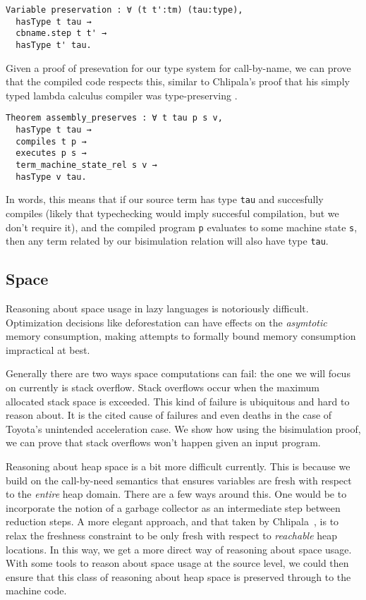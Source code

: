 \begin{lstlisting}
Variable preservation : ∀ (t t':tm) (tau:type), 
  hasType t tau → 
  cbname.step t t' →
  hasType t' tau.
\end{lstlisting}

Given a proof of presevation for our type system for call-by-name, we can prove
that the compiled code respects this, similar to Chlipala's proof that his
simply typed lambda calculus compiler was type-preserving \cite{?}.

\begin{lstlisting}
Theorem assembly_preserves : ∀ t tau p s v, 
  hasType t tau → 
  compiles t p → 
  executes p s →
  term_machine_state_rel s v → 
  hasType v tau.
\end{lstlisting}

In words, this means that if our source term has type \texttt{tau} and
succesfully compiles (likely that typechecking would imply succesful compilation,
but we don't require it), and the compiled program \texttt{p} evaluates to some
machine state \texttt{s}, then any term related by our bisimulation relation
will also have type \texttt{tau}.

\subsection{Space}

Reasoning about space usage in lazy languages is notoriously difficult.
Optimization decisions like deforestation can have effects on the
\emph{asymtotic} memory consumption, making attempts to formally bound memory
consumption impractical at best. 

Generally there are two ways space computations can fail: the one we will focus
on currently is stack overflow. Stack overflows occur when the maximum allocated
stack space is exceeded. This kind of failure is ubiquitous and hard to reason
about. It is the cited cause of failures and even deaths in the case of Toyota's
unintended acceleration case. We show how using the bisimulation proof, we can
prove that stack overflows won't happen given an input program. 

Reasoning about heap space is a bit more difficult currently. This is
because we build on the call-by-need semantics that ensures variables are fresh
with respect to the \emph{entire} heap domain. There are a few ways around this.
One would be to incorporate the notion of a garbage collector as an intermediate
step between reduction steps. A more elegant approach, and that taken by
Chlipala~\cite{chlipala}, is to relax the freshness constraint to be only fresh
with respect to \emph{reachable} heap locations. In this way, we get a more
direct way of reasoning about space usage. With some tools to reason about space
usage at the source level, we could then ensure that this class of reasoning
about heap space is preserved through to the machine code.

